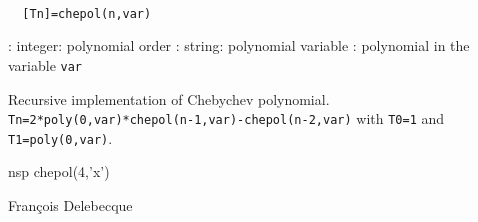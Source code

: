 
\begin{mandesc}
   \\ %
\end{mandesc}
\begin{calling_sequence}
\begin{verbatim}
  [Tn]=chepol(n,var)  
\end{verbatim}
\end{calling_sequence}
\begin{parameters}
  \begin{varlist}
    : integer: polynomial order
    : string: polynomial variable
    : polynomial in the variable \verb!var!
  \end{varlist}
\end{parameters}
\begin{mandescription}
  Recursive implementation of Chebychev polynomial.
  \verb!Tn=2*poly(0,var)*chepol(n-1,var)-chepol(n-2,var)! with
  \verb!T0=1! and \verb!T1=poly(0,var)!.
\end{mandescription}
\begin{examples}
  \begin{mintednsp}{nsp}
    chepol(4,'x')
  \end{mintednsp}
\end{examples}
\begin{authors}
  Fran\c{c}ois  Delebecque  
\end{authors}
